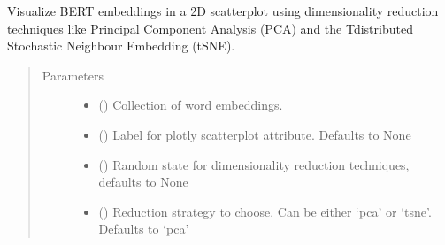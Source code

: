 \documentclass[letterpaper,10pt,english]{sphinxmanual}
\begin{document}
\begin{fulllineitems}
\label{\detokenize{code:code_utils.plotter.display_embeddings_scatterplot_2D}}
Visualize BERT embeddings in a 2D scatterplot using dimensionality
reduction techniques like Principal Component Analysis (PCA) and the T\sphinxhyphen{}distributed
Stochastic Neighbour Embedding (t\sphinxhyphen{}SNE).
\begin{quote}\begin{description}
\item[{Parameters}] \leavevmode\begin{itemize}
\item {} 
 () \textendash{} Collection of word embeddings.

\item {} 
 (\sphinxstyleliteralemphasis{\sphinxupquote{, }}) \textendash{} Label for plotly scatterplot  attribute.
Defaults to None

\item {} 
 (\sphinxstyleliteralemphasis{\sphinxupquote{, }}) \textendash{} Random state for dimensionality reduction techniques,
defaults to None

\item {} 
 (\sphinxstyleliteralemphasis{\sphinxupquote{, }}) \textendash{} Reduction strategy to choose. Can be either
‘pca’ or ‘tsne’. Defaults to ‘pca’


\end{itemize}
\end{description}
\end{quote}
\end{fulllineitems}
\end{document}

